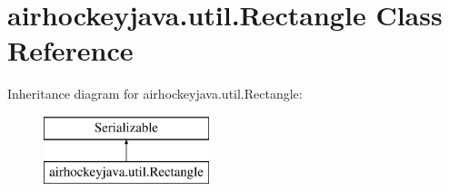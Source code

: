 \hypertarget{classairhockeyjava_1_1util_1_1_rectangle}{}\section{airhockeyjava.\+util.\+Rectangle Class Reference}
\label{classairhockeyjava_1_1util_1_1_rectangle}
Inheritance diagram for airhockeyjava.\+util.\+Rectangle\+:\begin{figure}[H]
\begin{center}
\leavevmode
\includegraphics[height=2.000000cm]{classairhockeyjava_1_1util_1_1_rectangle}
\end{center}
\end{figure}
